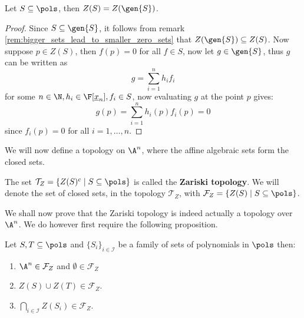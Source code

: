 \begin{lemma}\label{lem:algebraic_set_of_ideal}
  Let $S \subseteq \pols$, then $Z(S) = Z(\gen{S})$.
\end{lemma}
\begin{proof}
  Since $S \subseteq \gen{S}$, it follows from remark \ref{rem:bigger_sets_lead_to_smaller_zero_sets} that $Z(\gen{S}) \subseteq Z(S)$. Now suppose $p \in Z(S)$, then $f(p) = 0$ for all $f \in S$, now let $g \in \gen{S}$, thus $g$ can be written as
  \begin{equation*}
    g = \sum^{n}_{i = 1} h_{i} f_{i}
  \end{equation*}
  for some $n \in \N, h_{i} \in \F[\underline{x}_{n}], f_{i} \in S$, now evaluating $g$ at the point $p$ gives:
  \begin{equation*}
    g(p)=\sum^{n}_{i = 1} h_{i}(p) f_{i}(p) = 0
  \end{equation*}
  since $f_{i}(p) = 0$ for all $i = 1, \ldots, n$.
\end{proof}
We will now define a topology on $\A^{n}$, where the affine algebraic sets form the closed sets.
\begin{definition}
  The set $\mathcal{T}_{Z} = \{Z(S)^{c} \;\vert\; S \subseteq \pols\}$ is called the \textbf{Zariski topology}. We will denote the set of closed sets, in the topology $\mathcal{T}_{Z}$, with $\mathcal{F}_{Z} = \{Z(S) \;\vert\; S \subseteq \pols\}$.
\end{definition}
We shall now prove that the Zariski topology is indeed actually a topology over $\A^{n}$. We do however first require the following proposition.
\begin{proposition}\label{prop:closed_sets_zariski}
  Let $S, T \subseteq \pols$ and $\{S_{i}\}_{i \in \mathcal{I}}$ be a family of sets of polynomials in $\pols$ then:
  \begin{enumerate}
    \item $\A^{n} \in \mathcal{F}_{Z}$ and $\emptyset \in \mathcal{F}_{Z}$
    \item $Z(S) \cup Z(T) \in \mathcal{F}_{Z}$.
    \item $\bigcap_{i \in \mathcal{I}} Z(S_{i}) \in \mathcal{F}_{Z}$.
  \end{enumerate}
\end{proposition}
